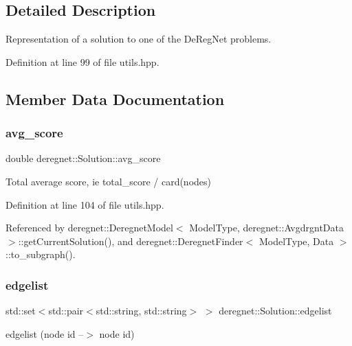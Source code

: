 \subsection{Detailed Description}
Representation of a solution to one of the De\+Reg\+Net problems. 

Definition at line 99 of file utils.\+hpp.



\subsection{Member Data Documentation}
\mbox{\label{structderegnet_1_1Solution_a9282be3934d49183f8b5304130ee07c7}} 
\subsubsection{\texorpdfstring{avg\+\_\+score}{avg\_score}}
{\footnotesize\ttfamily double deregnet\+::\+Solution\+::avg\+\_\+score}



Total average score, ie total\+\_\+score / card(nodes) 



Definition at line 104 of file utils.\+hpp.



Referenced by deregnet\+::\+Deregnet\+Model$<$ Model\+Type, deregnet\+::\+Avgdrgnt\+Data $>$\+::get\+Current\+Solution(), and deregnet\+::\+Deregnet\+Finder$<$ Model\+Type, Data $>$\+::to\+\_\+subgraph().

\mbox{\label{structderegnet_1_1Solution_aa4dcc94d51fa7e4e9443263572d8b18d}} 
\subsubsection{\texorpdfstring{edgelist}{edgelist}}
{\footnotesize\ttfamily std\+::set$<$std\+::pair$<$std\+::string, std\+::string$>$ $>$ deregnet\+::\+Solution\+::edgelist}



edgelist (node id --$>$ node id) 



